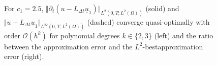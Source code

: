 \documentclass[sn-mathphys-num]{sn-jnl}
\numberwithin{equation}{section}
\newcommand{\ul}{\underline{u}}
\newcommand{\dt}{\partial_t}
\begin{document}
\begin{figure}[!htbp]
\begin{center}
    \end{center}
    \caption{For $c_1 = 2.5$, $\Vert \dt(u-L_{\Delta t} \ul_1) \Vert_{L^2(0,T;L^2(\Omega))}$ (solid) and $\Vert u-L_{\Delta t} \ul_1 \Vert_{L^\infty(0,T;L^2(\Omega))}$ (dashed) converge quasi-optimally with order $\mathcal{O}(h^k)$ for polynomial degrees $k \in \{2,3\}$ (left) and the ratio between the approximation error and the $L^2$-bestapproximation error (right).}
    \label{fig:2DjumpCoefs}
  \end{figure}
\end{document}
